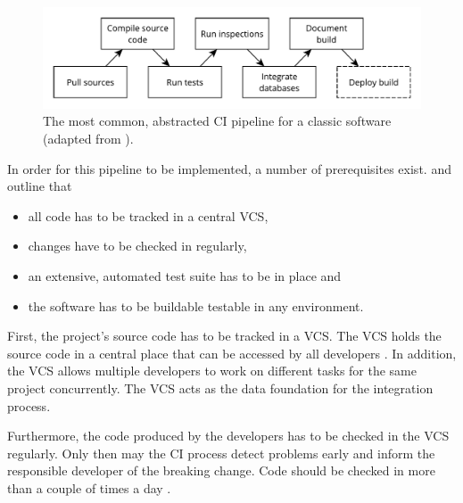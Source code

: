 \begin{figure}[H]
\begin{center}
  \includegraphics[scale=0.7]{images/figures/ci_classic.pdf}
\end{center}
\caption[The most common, abstracted \ac{CI} pipeline for a classic
software.]{The most common, abstracted \ac{CI} pipeline for a classic
software (adapted from \autocite[Fig. 1-4]{MatyasContinuousIntegration2007}).}%
\label{fig:ci_pipeline_classic}
\end{figure}

In order for this pipeline to be implemented, a number of prerequisites exist.
\autocite{MatyasContinuousIntegration2007} and
\autocite{JezHumbleContinuousDelivery2010} outline that

\begin{itemize}
  \item all code has to be tracked in a central \ac{VCS},
  \item changes have to be checked in regularly,
  \item an extensive, automated test suite has to be in place and
  \item the software has to be buildable testable in any environment.
\end{itemize}

First, the project's source code has to be tracked in a \ac{VCS}. The \ac{VCS}
holds the source code in a central place that can be accessed by all developers
\autocite[Ch.  1]{MatyasContinuousIntegration2007}. In addition, the \ac{VCS}
allows multiple developers to work on different tasks for the same project
concurrently. The \ac{VCS} acts as the data foundation for the integration
process.

Furthermore, the code produced by the developers has to be checked in the
\ac{VCS} regularly. Only then may the \ac{CI} process detect problems early and
inform the responsible developer of the breaking change. Code should be checked
in more than a couple of times a day \autocite[p.
59]{JezHumbleContinuousDelivery2010}. 

